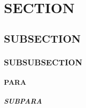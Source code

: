 \documentclass[UTF8,zihao=5]{ctexart} %
\begin{document}
\section{SECTION}

\subsection{SUBSECTION}

\subsubsection{SUBSUBSECTION}

\paragraph{PARA}

\subparagraph{SUBPARA}
\end{document}
